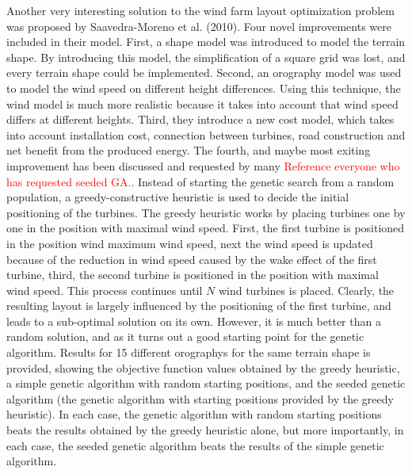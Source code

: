 \noindent Another very interesting solution to the wind farm layout optimization problem was proposed by Saavedra-Moreno et al. (2010). Four novel improvements were included in their model. First, a shape model was introduced to model the terrain shape. By introducing this model, the simplification of a square grid was lost, and every terrain shape could be implemented. Second, an orography model was used to model the wind speed on different height differences. Using this technique, the wind model is much more realistic because it takes into account that wind speed differs at different heights. Third, they introduce a new cost model, which takes into account installation cost, connection between turbines, road construction and net benefit from the produced energy. The fourth, and maybe most exiting improvement has been discussed and requested by many \textcolor{red}{Reference everyone who has requested seeded GA.}. Instead of starting the genetic search from a random population, a greedy-constructive heuristic is used to decide the initial positioning of the turbines. The greedy heuristic works by placing turbines one by one in the position with maximal wind speed. First, the first turbine is positioned in the position wind maximum wind speed, next the wind speed is updated because of the reduction in wind speed caused by the wake effect of the first turbine, third, the second turbine is positioned in the position with maximal wind speed. This process continues until $N$ wind turbines is placed. Clearly, the resulting layout is largely influenced by the positioning of the first turbine, and leads to a sub-optimal solution on its own. However, it is much better than a random solution, and as it turns out a good starting point for the genetic algorithm. Results for 15 different orographys for the same terrain shape is provided, showing the objective function values obtained by the greedy heuristic, a simple genetic algorithm with random starting positions, and the seeded genetic algorithm (the genetic algorithm with starting positions provided by the greedy heuristic). In each case, the genetic algorithm with random starting positions beats the results obtained by the greedy heuristic alone, but more importantly, in each case, the seeded genetic algorithm beats the results of the simple genetic algorithm. \\


